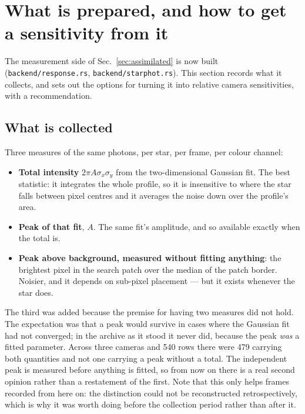 \documentclass[11pt,a4paper]{article}
\begin{document}
\section{What is prepared, and how to get a sensitivity from it}
\label{sec:prepared}

The measurement side of Sec.~\ref{sec:assimilated} is now built
(\texttt{backend/response.rs}, \texttt{backend/starphot.rs}). This section
records what it collects, and sets out the options for turning it into relative
camera sensitivities, with a recommendation.

\subsection{What is collected}

Three measures of the same photons, per star, per frame, per colour channel:

\begin{itemize}
  \item \textbf{Total intensity} $2\pi A\sigma_x\sigma_y$ from the
    two-dimensional Gaussian fit. The best statistic: it integrates the whole
    profile, so it is insensitive to where the star falls between pixel centres
    and it averages the noise down over the profile's area.
  \item \textbf{Peak of that fit}, $A$. The same fit's amplitude, and so
    available exactly when the total is.
  \item \textbf{Peak above background, measured without fitting anything}:
    the brightest pixel in the search patch over the median of the patch
    border. Noisier, and it depends on sub-pixel placement --- but it exists
    whenever the star does.
\end{itemize}

The third was added because the premise for having two measures did not hold.
The expectation was that a peak would survive in cases where the Gaussian fit
had not converged; in the archive as it stood it never did, because the peak
\emph{was} a fitted parameter. Across three cameras and \num{540} rows there
were \num{479} carrying both quantities and not one carrying a peak without a
total. The independent peak is measured before anything is fitted, so from now
on there is a real second opinion rather than a restatement of the first. Note
that this only helps frames recorded from here on: the distinction could not be
reconstructed retrospectively, which is why it was worth doing before the
collection period rather than after it.
\end{document}

